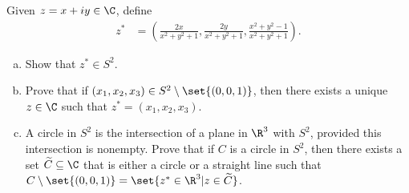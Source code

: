 \documentclass[11pt]{mypackage}
\begin{document}
\RaggedRight
\begin{problem}[Problem 1]
  Given $z = x + iy\in \C$, define
  \begin{align*}
    z^{\ast} &= \left( \frac{2x}{x^2 + y^2 + 1}, \frac{2y}{x^2 + y^2 + 1}, \frac{x^2 + y^2 - 1}{x^2 + y^2 + 1} \right).
  \end{align*}
  \begin{enumerate}[(a)]
    \item Show that $z^{\ast}\in S^2$.
    \item Prove that if $\left( x_1,x_2,x_3 \right)\in S^2\setminus \set{(0,0,1)}$, then there exists a unique $z\in \C$ such that $z^{\ast} = \left( x_1,x_2,x_3 \right)$.
    \item A circle in $S^2$ is the intersection of a plane in $\R^3$ with $S^2$, provided this intersection is nonempty. Prove that if $C$ is a circle in $S^{2}$, then there exists a set $\widetilde{C}\subseteq \C$ that is either a circle or a straight line such that $C\setminus \set{(0,0,1)} = \set{z^{\ast}\in \R^3 | z\in \widetilde{C}}$.
  \end{enumerate}
\end{problem}
\end{document}
